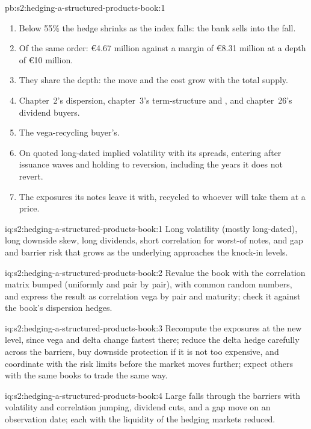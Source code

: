 \begin{solution}{pb:s2:hedging-a-structured-products-book:1}
\begin{enumerate}
\item Below 55\% the hedge shrinks as the index falls: the bank sells into the fall.
\item Of the same order: \euro4.67 million against a margin of \euro8.31 million at a depth of \euro10 million.
\item They share the depth: the move and the cost grow with the total supply.
\item Chapter~2's dispersion, chapter~3's term-structure and , and chapter~26's dividend buyers.
\item The vega-recycling buyer's.
\item On quoted long-dated implied volatility with its spreads, entering after issuance waves and holding to reversion, including the years it does not
revert.
\item The exposures its notes leave it with, recycled to whoever will take them at a price.
\end{enumerate}
\end{solution}

\begin{solution}{iq:s2:hedging-a-structured-products-book:1}
Long volatility (mostly long-dated), long downside skew, long dividends, short correlation for worst-of notes, and gap and barrier risk that grows as
the underlying approaches the knock-in levels.
\end{solution}

\begin{solution}{iq:s2:hedging-a-structured-products-book:2}
Revalue the book with the correlation matrix bumped (uniformly and pair by pair), with common random numbers, and express the result as correlation
vega by pair and maturity; check it against the book's dispersion hedges.
\end{solution}

\begin{solution}{iq:s2:hedging-a-structured-products-book:3}
Recompute the exposures at the new level, since vega and delta change fastest there; reduce the delta hedge carefully across the barriers, buy
downside protection if it is not too expensive, and coordinate with the risk limits before the market moves further; expect others with the same
books to trade the same way.
\end{solution}

\begin{solution}{iq:s2:hedging-a-structured-products-book:4}
Large falls through the barriers with volatility and correlation jumping, dividend cuts, and a gap move on an observation date; each with the
liquidity of the hedging markets reduced.
\end{solution}


